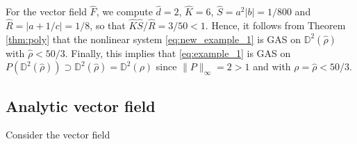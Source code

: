 \documentclass{article}
\begin{document}
For the vector field $\widehat{F}$, we compute $\widehat{d}=2$, $\widehat{K}=6$, $\widehat{S}=a^2|b|=1/800$ and $\widehat{R}=| a+1/c|=1/8$, so that
$\widehat{K}\widehat{S}/\widehat{R}=3/50<1.$
Hence, it follows from Theorem \ref{thm:poly} that the nonlinear system \eqref{eq:new_example_1} is GAS on $\mathbb{D}^2(\widehat{\rho})$ with $\widehat{\rho}<50/3$. Finally, this implies that \eqref{eq:example_1} is GAS on $P(\mathbb{D}^2(\widehat{\rho})) \supset \mathbb{D}^2(\widehat{\rho})=\mathbb{D}^2(\rho)$ since $\|P\|_\infty=2>1$ and with $\rho =\widehat{\rho}<50/3$.



\subsection{Analytic vector field}

Consider the vector field 
\end{document}
